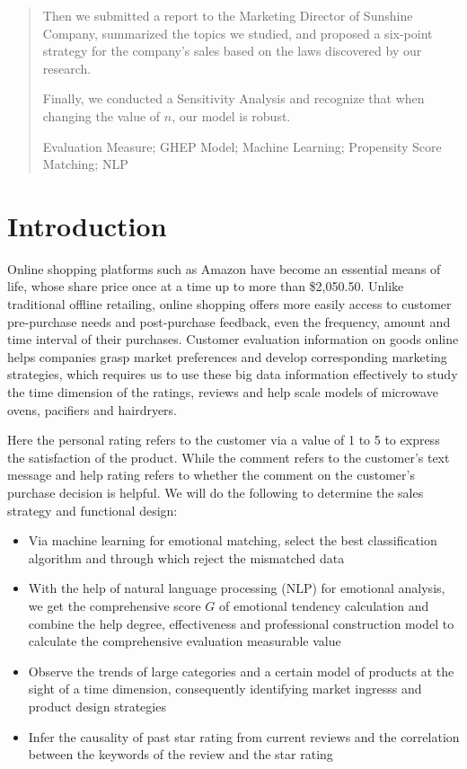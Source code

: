\documentclass{mcmthesis}
\begin{document}
\begin{abstract}
Then we submitted a report to the Marketing Director of Sunshine Company, summarized the topics we studied, and proposed a six-point strategy for the company's sales based on the laws discovered by our research.

Finally, we conducted a Sensitivity Analysis and recognize that when changing the value of $n$, our model is robust.
\begin{keywords}
	\footnotesize
Evaluation Measure; GHEP Model; Machine Learning; Propensity Score Matching; NLP
\end{keywords}
\end{abstract}
\maketitle

\tableofcontents
\clearpage
\normalsize
\section{Introduction}
Online shopping platforms such as Amazon have become an essential means of life, whose share price once at a time up to more than \$2,050.50. Unlike traditional offline retailing, online shopping offers more easily access to customer pre-purchase needs and post-purchase feedback, even the frequency, amount and time interval of their purchases. Customer evaluation information on goods online helps companies grasp market preferences and develop corresponding marketing strategies, which requires us to use these big data information effectively to study the time dimension of the ratings, reviews and help scale models of microwave ovens, pacifiers and hairdryers.

Here the personal rating refers to the customer via a value of 1 to 5 to express the satisfaction of the product. While the comment refers to the customer's text message and help rating refers to whether the comment on the customer's purchase decision is helpful. We will do the following to determine the sales strategy and functional design:

\begin{itemize}
\item 
Via machine learning for emotional matching, select the best classification algorithm and through which reject the mismatched data
\item 
With the help of natural language processing (NLP) for emotional analysis, we get the comprehensive score $ G $ of emotional tendency calculation and combine the help degree, effectiveness and professional construction model to calculate the comprehensive evaluation measurable value
\item Observe the trends of large categories and a certain model of products at the sight of a time dimension, consequently identifying market ingresss and product design strategies
\item Infer the causality of past star rating from current reviews and the correlation between the keywords of the review and the star rating
\end{itemize}
\end{document}
